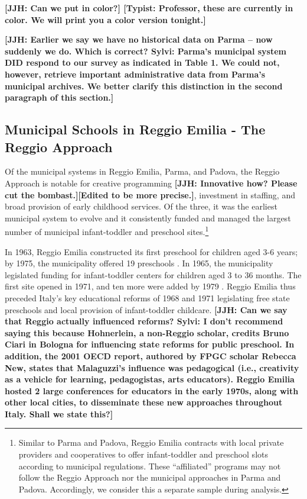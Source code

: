 \textbf{[JJH: Can we put in color?] [Typist: Professor, these are currently in color. We will print you a color version tonight.]}

\textbf{[JJH: Earlier we say we have no historical data on Parma -- now suddenly we do. Which is correct? Sylvi: Parma's municipal system DID respond to our survey as indicated in Table 1. We could not, however, retrieve important administrative data from Parma's municipal archives. We better clarify this distinction in the second paragraph of this section.]}


\subsection{Municipal Schools in Reggio Emilia - The Reggio Approach}

Of the municipal systems in Reggio Emilia, Parma, and Padova, the Reggio Approach is notable for creative programming \textbf{[JJH: Innovative how? Please cut the bombast.][Edited to be more precise.]}, investment in staffing, and broad provision of early childhood services. Of the three, it was the earliest municipal system to evolve and it consistently funded and managed the largest number of municipal infant-toddler and preschool sites.\footnote{Similar to Parma and Padova, Reggio Emilia contracts with local private providers and cooperatives to offer infant-toddler and preschool slots according to municipal regulations. These ``affiliated'' programs may not follow the Reggio Approach nor the municipal approaches in Parma and Padova. Accordingly, we consider this a separate sample during analysis.} 

In 1963, Reggio Emilia constructed its first preschool for children aged 3-6 years; by 1975, the municipality offered 19 preschools \citep{Hohnerlein_2009_Paradox-Public-Preschools}. In 1965, the municipality legislated funding for infant-toddler centers for children aged 3 to 36 months. The first site opened in 1971, and ten more were added by 1979 \citep{Cagliari-etal-eds_2016_BOOK_Loris-Malaguzzi}. Reggio Emilia thus preceded Italy's key educational reforms of 1968 and 1971 legislating free state preschools and local provision of infant-toddler childcare. \textbf{[JJH: Can we say that Reggio actually influenced reforms? Sylvi: I don't recommend saying this because Hohnerlein, a non-Reggio scholar, credits Bruno Ciari in Bologna for influencing state reforms for public preschool. In addition, the 2001 OECD report, authored by FPGC scholar Rebecca New, states that Malaguzzi's influence was pedagogical (i.e., creativity as a vehicle for learning, pedagogistas, arts educators). Reggio Emilia hosted 2 large conferences for educators in the early 1970s, along with other local cities, to disseminate these new approaches throughout Italy. Shall we state this?]}

